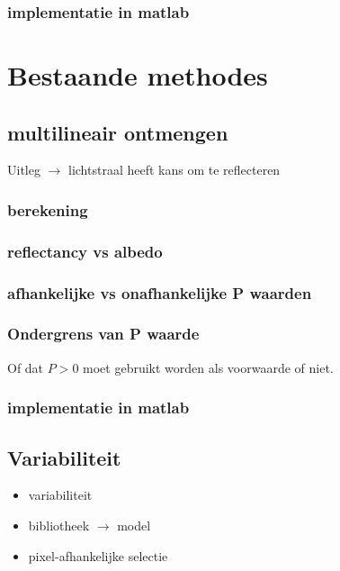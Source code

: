 \documentclass[12pt]{report}
\begin{document}
\subsection{implementatie in matlab}

\chapter{Bestaande methodes} 

\section{multilineair ontmengen}

Uitleg $\rightarrow$ lichtstraal heeft kans om te reflecteren

\subsection{berekening}

\subsection{reflectancy vs albedo}

\subsection{afhankelijke vs onafhankelijke P waarden}

\subsection{Ondergrens van P waarde}

Of dat $P > 0$ moet gebruikt worden als voorwaarde of niet.

\subsection{implementatie in matlab}



\section{Variabiliteit}\label{sec:select}

\begin{itemize}
\item variabiliteit
\item bibliotheek $\rightarrow$ model
\item pixel-afhankelijke selectie
\end{itemize}
\end{document}
